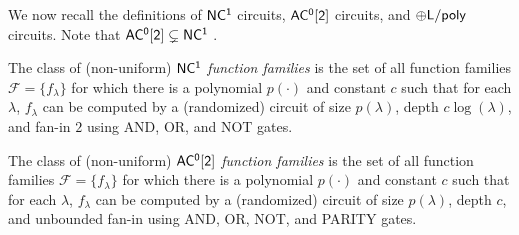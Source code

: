  We now recall the definitions of
$\ncone$ circuits, $\aczerotwo$ circuits, and ${\sf \oplus L/poly}$ circuits. Note that $\mathsf{AC^0[2]}\subsetneq\mathsf{NC^1}$ \cite{Razborov1987,STOC:Smolensky87}.
\begin{definition}[$\ncone$]
The class of (non-uniform) \emph{$\ncone$ function families} is the set of all function families $\mathcal{F} = \{f_{\lambda}\}$ for which there is a polynomial $p(\cdot)$ and constant $c$ such that for each $\lambda$, $f_{\lambda}$ can be computed by a (randomized) circuit of size $p(\lambda)$, depth $c\log(\lambda)$, and fan-in $2$ using {\sf AND}, {\sf OR}, and {\sf NOT} gates.
\end{definition}
%
%
\begin{definition}[$\aczerotwo$]
The class of (non-uniform) \emph{$\aczerotwo$ function families} is the set of all function families $\mathcal{F} = \{f_{\lambda}\}$ for which there is a polynomial $p(\cdot)$ and constant $c$ such that for each $\lambda$, $f_{\lambda}$ can be computed by a (randomized) circuit of size $p(\lambda)$, depth $c$, and unbounded fan-in using {\sf AND}, {\sf OR}, {\sf NOT}, and {\sf PARITY} gates.
\end{definition}
%
%
%
%
